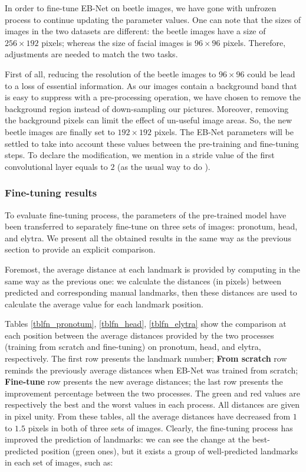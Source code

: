 \documentclass[review]{elsarticle}
\begin{document}
In order to fine-tune EB-Net on beetle images, we have gone with unfrozen process to continue updating the parameter values. One can note that the sizes of images in the two datasets are different: the beetle images have a size of $256 \times 192$ pixels; whereas the size of facial images is $96 \times 96$ pixels. Therefore, adjustments are needed to match the two tasks.

First of all, reducing the resolution of the beetle images to $96 \times 96$ could be lead to a loss of essential information. As our images contain a background band that is easy to suppress with a pre-processing operation, we have chosen to remove the background
region instead of down-sampling our pictures. Moreover, removing the background pixels can limit the effect of un-useful image areas. So, the new beetle images are finally set to $192 \times 192$ pixels. The EB-Net parameters will be settled to take into account these values between the pre-training and fine-tuning steps. To declare the modification, we mention in a stride value of the first convolutional layer equals to $2$ (as the usual way to do \cite{yosinski2014transferable}). 

\subsubsection{Fine-tuning results}
To evaluate fine-tuning process, the parameters of the pre-trained model have been transferred to
separately fine-tune on three sets of images: pronotum, head, and elytra. We present all the obtained results in the same way as the previous section to provide an explicit comparison.

Foremost, the average distance at each landmark is provided by computing in the same way as the previous one: we calculate the distances (in pixels) between predicted and corresponding manual landmarks, then these distances are used to calculate the average value for each landmark position. 

Tables \ref{tblfn_pronotum}, \ref{tblfn_head}, \ref{tblfn_elytra} show the comparison at each position between the average distances provided by the two processes (training from scratch and fine-tuning) on pronotum, head, and elytra, respectively.  The first row presents the landmark number; \textbf{From scratch} row reminds the previously average distances when EB-Net was trained from scratch; \textbf{Fine-tune} row presents the new average distances; the last row presents the improvement percentage between the two processes. The green and red values are respectively the best and the worst values in each process. All distances are given in pixel unity. From these tables, all the average distances have decreased from $1$ to $1.5$ pixels in both of three sets of images. Clearly, the fine-tuning process has improved the prediction of landmarks: we can see the change at the best-predicted position (green ones), but it exists a group of well-predicted landmarks in each set of images, such as:
\end{document}
